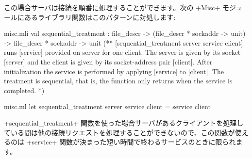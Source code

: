 この場合サーバは接続を順番に処理することができます。次の \ml+Misc+ モジュールにあるライブラリ関数はこのパターンに対処します:
\begin{codefile}{misc.mli}
val sequential_treatment :
file_descr -> (file_descr * sockaddr -> unit) ->
file_descr * sockaddr -> unit
(** [sequential_treatment server service client] runs [service] provided
      on server for one client. The server is given by its socket [server]
      and the client is given by its socket-address pair [client]. After
      initialization the service is performed by applying [service] to
      [client]. The treatment is sequential, that is, the function only
      returns when the service is completed. *)
\end{codefile}
%
\begin{listingcodefile}{misc.ml}
let sequential_treatment server service client = service client
\end{listingcodefile}
\ml+sequential_treatment+ 関数を使った場合サーバがあるクライアントを処理している間は他の接続リクエストを処理することができないので、この関数が使えるのは \ml+service+ 関数が決まった短い時間で終わるサービスのときに限られます。


